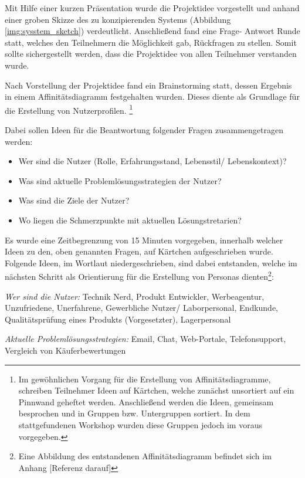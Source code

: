 Mit Hilfe einer kurzen Präsentation wurde die Projektidee vorgestellt und anhand einer groben Skizze des zu konzipierenden Systems (Abbildung \ref{img:sysstem_sketch}) verdeutlicht. 
Anschließend fand eine Frage- Antwort Runde statt, welches den Teilnehmern die Möglichkeit gab, Rückfragen zu stellen. Somit sollte sichergestellt werden, dass die Projektidee von 
allen Teilnehmer verstanden wurde. 

Nach Vorstellung der Projektidee fand ein Brainstorming statt, dessen Ergebnis in einem Affinitätsdiagramm festgehalten wurden. Dieses diente als Grundlage für die Erstellung von Nutzerprofilen. 
\footnote{Im gewöhnlichen Vorgang für die Erstellung von Affinitätsdiagramme, schreiben Teilnehmer Ideen auf Kärtchen, welche zunächst unsortiert auf ein Pinnwand geheftet werden. 
Anschließend werden die Ideen, gemeinsam besprochen und in Gruppen bzw. Untergruppen sortiert. In dem stattgefundenen Workshop wurden diese Gruppen jedoch im voraus vorgegeben.}

Dabei sollen Ideen für die Beantwortung folgender Fragen zusammengetragen werden: 

\begin{itemize}
	\item Wer sind die Nutzer (Rolle, Erfahrungsstand,  Lebensstil/ Lebenskontext)?
	\item Was sind aktuelle Problemlösungsstrategien der Nutzer?
	\item Was sind die Ziele der Nutzer?
	\item Wo liegen die Schmerzpunkte mit aktuellen Lösungstretarien?
\end{itemize}\label{list:AffiDiagramm}

Es wurde eine Zeitbegrenzung von 15 Minuten vorgegeben, innerhalb welcher Ideen zu den, oben genannten Fragen, auf Kärtchen aufgeschrieben wurde.
Folgende Ideen, im Wortlaut niedergeschrieben, sind dabei entstanden, welche im nächsten Schritt als Orientierung für die Erstellung von Personas dienten\footnote{Eine Abbildung des entstandenen Affinitätsdiagramm befindet sich im Anhang [Referenz darauf]}: 

\vspace{2mm}
\textit{Wer sind die Nutzer:} 
Technik Nerd, Produkt Entwickler, Werbeagentur, Unzufriedene, Unerfahrene, Gewerbliche Nutzer/ Laborpersonal, Endkunde, Qualitätsprüfung eines Produkts (Vorgesetzter), Lagerpersonal

\vspace{2mm}
\textit{Aktuelle Problemlösungsstrategien:} 
Email, Chat, Web-Portale, Telefonsupport, Vergleich von Käuferbewertungen

